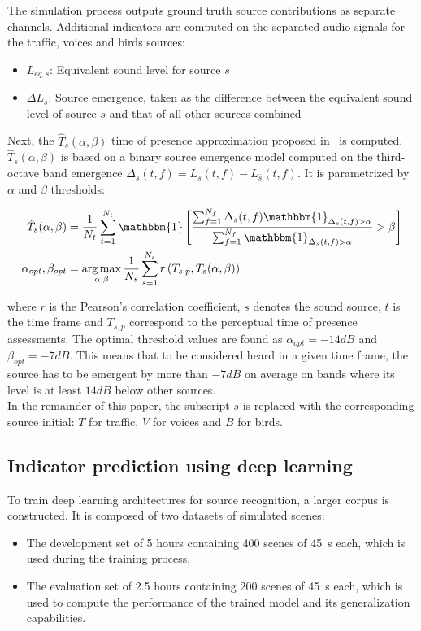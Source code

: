 \documentclass[11pt,a4paper]{article}
\DeclareMathOperator*{\argmax}{arg\,max}
\begin{document}
The simulation process outputs ground truth source contributions as separate channels. Additional indicators are computed on the separated audio signals for the traffic, voices and birds sources:

\begin{itemize}
\item $L_{eq, s}$: Equivalent sound level for source $s$
\item $\Delta L_{s}$: Source emergence, taken as the difference between the equivalent sound level of source $s$ and that of all other sources combined
\end{itemize}

Next, the $\hat T_s(\alpha, \beta)$ time of presence approximation proposed in~\cite{gontier2018} is computed. $\hat T_s(\alpha, \beta)$ is based on a binary source emergence model computed on the third-octave band emergence $\Delta_s(t, f) = L_s(t, f) - L_{\bar{s}}(t, f)$. It is parametrized by $\alpha$ and $\beta$ thresholds:

\begin{align}
\hat T_s(\alpha, \beta) &= \frac{1}{N_t}\sum_{t = 1}^{N_t}\mathbbm{1}\left[ \frac{\sum_{f = 1}^{N_f}\Delta_s(t, f)\mathbbm{1}_{\Delta_s(t, f)>\alpha}}{\sum_{f = 1}^{N_f}\mathbbm{1}_{\Delta_s(t, f)>\alpha}}>\beta \right]\\
\alpha_{opt},\beta_{opt} &= \argmax_{\alpha, \beta}\frac{1}{N_s}\sum_{s = 1}^{N_s}r\left(T_{s, p}, T_s(\alpha, \beta)\right)
\end{align}

where $r$ is the Pearson's correlation coefficient, $s$ denotes the sound source, $t$ is the time frame and $T_{s, p}$ correspond to the perceptual time of presence assessments. The optimal threshold values are found as $\alpha_{opt} = -14dB$ and $\beta_{opt} = -7dB$. This means that to be considered heard in a given time frame, the source has to be emergent by more than $-7dB$ on average on bands where its level is at least $14dB$ below other sources.\\

In the remainder of this paper, the subscript $s$ is replaced with the corresponding source initial: $T$ for traffic, $V$ for voices and $B$ for birds.


\subsection{Indicator prediction using deep learning}
\label{sec:methods_deep}

To train deep learning architectures for source recognition, a larger corpus is constructed. It is composed of two datasets of simulated scenes:
\begin{itemize}
\item The development set of 5 hours containing 400 scenes of 45~s each, which is used during the training process,
\item The evaluation set of 2.5 hours containing 200 scenes of 45~s each, which is used to compute the performance of the trained model and its generalization capabilities.
\end{itemize}
\end{document}
